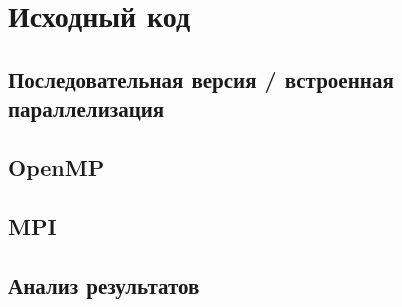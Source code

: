 \documentclass[a4paper,12pt]{article}
\begin{document}
\newpage
\section{Исходный код}
\subsection{Последовательная версия / встроенная параллелизация}


\newpage
\subsection{OpenMP}


\newpage
\subsection{MPI}


\newpage
\subsection{Анализ результатов}
\end{document}
